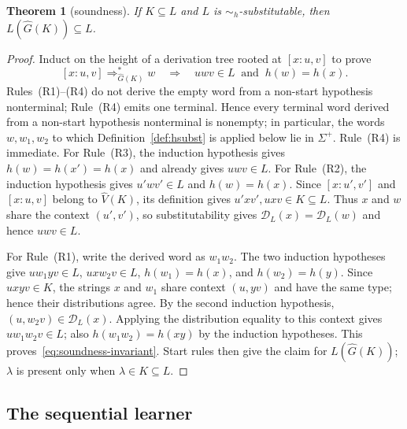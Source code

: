 \documentclass[11pt,a4paper]{article}
\newtheorem{theorem}{Theorem}[section]
\theoremstyle{remark}
\theoremstyle{plain}
\newcommand{\D}{\mathcal{D}}
\begin{document}
\begin{theorem}[soundness]\label{thm:soundness}
If $K\subseteq L$ and $L$ is $\sim_h$-substitutable, then
$L(\widehat G(K))\subseteq L$.
\end{theorem}

\begin{proof}
Induct on the height of a derivation tree rooted at $[x:u,v]$ to prove
\begin{equation}\label{eq:soundness-invariant}
 [x:u,v]\Rightarrow_{\widehat G(K)}^*w
 \quad\Longrightarrow\quad
 uwv\in L\ \text{ and }\ h(w)=h(x).
\end{equation}
Rules~(R1)--(R4) do not derive the empty word from a non-start hypothesis
nonterminal; Rule~(R4) emits one terminal.  Hence every terminal word derived from a non-start hypothesis
nonterminal is nonempty; in particular, the words $w,w_1,w_2$ to which
Definition~\ref{def:hsubst} is applied below lie in $\Sigma^+$.
Rule~(R4) is immediate.  For Rule~(R3), the induction hypothesis gives
$h(w)=h(x')=h(x)$ and already gives $uwv\in L$.  For Rule~(R2), the
induction hypothesis gives $u'wv'\in L$ and $h(w)=h(x)$.  Since
$[x:u',v']$ and $[x:u,v]$ belong to $\widehat V(K)$, its definition gives
$u'xv',uxv\in K\subseteq L$.  Thus $x$ and $w$ share the context
$(u',v')$, so substitutability gives $\D_L(x)=\D_L(w)$ and hence
$uwv\in L$.

For Rule~(R1), write the derived word as $w_1w_2$.  The two induction
hypotheses give
$uw_1yv\in L$, $uxw_2v\in L$,
$h(w_1)=h(x)$, and $h(w_2)=h(y)$.
Since $uxyv\in K$, the strings $x$ and $w_1$ share context $(u,yv)$ and
have the same type; hence their distributions agree.  By the second induction
hypothesis, $(u,w_2v)\in\D_L(x)$.  Applying the distribution equality to this
context gives $uw_1w_2v\in L$; also $h(w_1w_2)=h(xy)$ by the induction hypotheses.
This proves~\eqref{eq:soundness-invariant}.  Start rules then give the claim for $L(\widehat G(K))$;
$\lambda$ is present only when
$\lambda\in K\subseteq L$.
\end{proof}

\subsection{The sequential learner}
\end{document}
